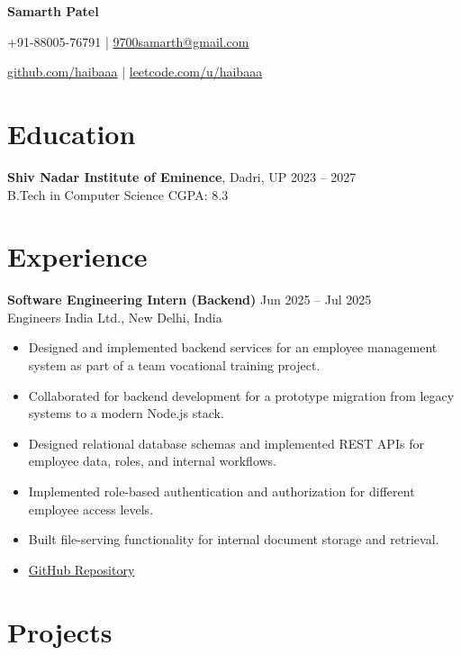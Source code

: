 \documentclass[a4paper,10pt]{article}
\begin{document}
\centerline{\Huge \bfseries Samarth Patel}
\centerline{+91-88005-76791 \quad | \quad \href{mailto:9700samarth@gmail.com}{9700samarth@gmail.com}}
\centerline{\href{https://github.com/haibaaa}{github.com/haibaaa} \quad | \quad \href{https://leetcode.com/u/haibaaa}{leetcode.com/u/haibaaa}}

\section*{Education}
\textbf{Shiv Nadar Institute of Eminence}, Dadri, UP \hfill 2023 -- 2027 \\
B.Tech in Computer Science \hfill CGPA: 8.3 \\

\section*{Experience}

\textbf{Software Engineering Intern (Backend)} \hfill Jun 2025 -- Jul 2025 \\
Engineers India Ltd., New Delhi, India

\begin{itemize}[noitemsep, topsep=2pt]
    \item Designed and implemented backend services for an employee management system as part of a team vocational training project.
    \item Collaborated for backend development for a prototype migration from legacy systems to a modern Node.js stack.
    \item Designed relational database schemas and implemented REST APIs for employee data, roles, and internal workflows.
    \item Implemented role-based authentication and authorization for different employee access levels.
    \item Built file-serving functionality for internal document storage and retrieval.
    \item \href{https://github.com/manny137/EIL}{GitHub Repository}
\end{itemize}

\section*{Projects}
\end{document}
